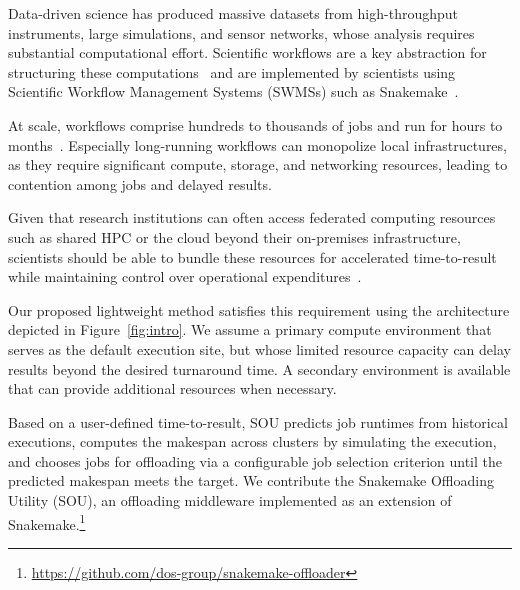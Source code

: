 Data-driven science has produced massive datasets from high-throughput instruments, large simulations, and sensor networks, whose analysis requires substantial computational effort. Scientific workflows are a key abstraction for structuring these computations~\cite{vivas_trends_2024} and are implemented by scientists using Scientific Workflow Management Systems (SWMSs) such as Snakemake~\cite{molder_sustainable_2021}.

At scale, workflows comprise hundreds to thousands of jobs and run for hours to months~\cite{juve_characterizing_2013}. Especially long-running workflows can monopolize local infrastructures, as they require significant compute, storage, and networking resources, leading to contention among jobs and delayed results.

Given that research institutions can often access federated computing resources such as shared HPC or the cloud beyond their on-premises infrastructure, scientists should be able to bundle these resources for accelerated time-to-result while maintaining control over operational expenditures~\cite{wang_managing_2016, farahani_clusterless_2026, zhang_elastic_2024}. 

Our proposed lightweight method satisfies this requirement using the architecture depicted in Figure~\ref{fig:intro}. 
We assume a primary compute environment that serves as the default execution site, but whose limited resource capacity can delay results beyond the desired turnaround time. 
A secondary environment is available that can provide additional resources when necessary. 

Based on a user-defined time-to-result, SOU predicts job runtimes from historical executions, computes the makespan across clusters by simulating the execution, and chooses jobs for offloading via a configurable job selection criterion until the predicted makespan meets the target.
We contribute the Snakemake Offloading Utility (SOU), an offloading middleware implemented as an extension of Snakemake.\footnote{\url{https://github.com/dos-group/snakemake-offloader}} 

